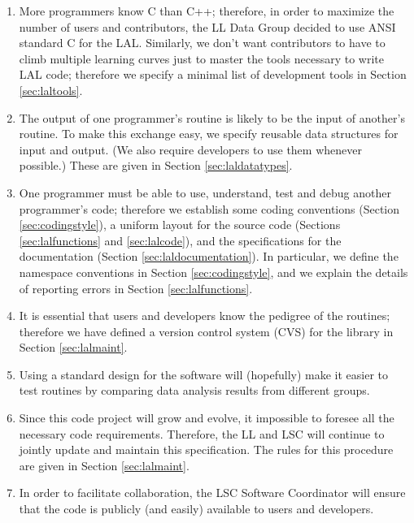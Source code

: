 \documentclass[]{ligodcc}
\begin{document}
\begin{enumerate}
\item
More programmers know C than C++; therefore, in order to
maximize the  number of users and  contributors, the  LL Data Group
decided to use ANSI standard C  for the LAL. Similarly, we don't
want contributors to have to climb multiple learning curves just to
master the tools necessary to write LAL code; therefore we specify a
minimal list of development tools in Section \ref{sec:laltools}.

\item
The output of one programmer's routine is likely to be the
input of another's  routine. To make this exchange easy,  we
specify reusable data structures for input and output. (We also
require developers to use them whenever possible.) These are given in
Section  \ref{sec:laldatatypes}.

\item
One programmer must be able to use, understand, test and debug another
programmer's code; therefore we establish some coding conventions
(Section \ref{sec:codingstyle}),  a uniform layout for the source code
(Sections \ref{sec:lalfunctions} and \ref{sec:lalcode}),  and the
specifications for the documentation (Section
\ref{sec:laldocumentation}). In particular, we
define the  namespace conventions  in Section \ref{sec:codingstyle},
and  we explain the
details of  reporting errors in Section \ref{sec:lalfunctions}.

\item
It is essential that users and developers know the pedigree of
the routines; therefore we have defined a version
control system (CVS) for the library in Section \ref{sec:lalmaint}.

\item
Using a standard design for the software will (hopefully) make it
easier to test routines by comparing data analysis results from
different groups.

\item
Since this code project will grow and evolve, it impossible to foresee
all the necessary code requirements. Therefore, the LL and LSC will
continue to jointly update and maintain this specification. The rules
for this procedure are given in Section \ref{sec:lalmaint}.

\item
In order to facilitate collaboration, the LSC Software
Coordinator will ensure that  the code is publicly (and easily)
available to users and developers.

\end{enumerate}
\end{document}

